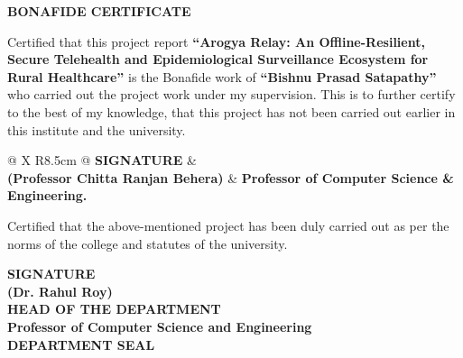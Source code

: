 \documentclass[12pt,a4paper,oneside]{report}
\begin{document}
\setcounter{page}{2}

\clearpage
{}
\thispagestyle{plain}

\begin{center}
    {\fontsize{16}{20}\selectfont \bfseries BONAFIDE CERTIFICATE}
\end{center}
\vspace{0.8cm}

{\fontsize{13}{20}\selectfont
\noindent Certified that this project report \textbf{``Arogya Relay: An Offline-Resilient, Secure Telehealth and Epidemiological Surveillance Ecosystem for Rural Healthcare''} is the Bonafide work of \textbf{``Bishnu Prasad Satapathy''} who carried out the project work under my supervision. This is to further certify to the best of my knowledge, that this project has not been carried out earlier in this institute and the university.
}

\vspace{1.8cm}

\noindent
\begin{tabularx}{\textwidth}{@{} X R{8.5cm} @{}}
    \textbf{SIGNATURE} & \\[1.0cm]
    \textbf{(Professor Chitta Ranjan Behera)} & \textbf{Professor of Computer Science \& Engineering.}
\end{tabularx}

\vspace{1.8cm}

{\fontsize{13}{20}\selectfont
\noindent Certified that the above-mentioned project has been duly carried out as per the norms of the college and statutes of the university.
}

\vspace{1.5cm}

\begin{center}
    \textbf{SIGNATURE} \\[1.0cm]
    \textbf{(Dr. Rahul Roy)} \\[0.15cm]
    \textbf{HEAD OF THE DEPARTMENT} \\[0.15cm]
    \textbf{Professor of Computer Science and Engineering} \\[1.0cm]
    \textbf{DEPARTMENT SEAL}
\end{center}
\end{document}

